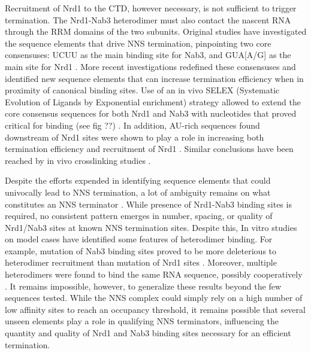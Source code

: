 Recruitment of Nrd1 to the CTD, however necessary, is not sufficient to trigger termination. 
The Nrd1-Nab3 heterodimer must also contact the nascent RNA through the RRM domains of the two subunits.
Original studies have investigated the sequence elements that drive NNS termination, pinpointing two core consensuses: UCUU as the main binding site for Nab3, and GUA[A/G] as the main site for Nrd1 \cite{carroll:2004:identification}. 
More recent investigations redefined these consensuses and identified new sequence elements that can increase termination efficiency when in proximity of canonical binding sites. 
Use of an in vivo SELEX (Systematic Evolution of Ligands by Exponential enrichment) strategy allowed to extend the core consensus sequences for both Nrd1 and Nab3 with nucleotides that proved critical for binding (see fig ??) \cite{porrua:2012:in}. 
In addition, AU-rich sequences found downstream of Nrd1 sites were shown to play a role in increasing both termination efficiency and recruitment of Nrd1 \cite{porrua:2012:in}. Similar conclusions have been reached by in vivo crosslinking studies \cite{wlotzka:2011:nuclear}.

Despite the efforts expended in identifying sequence elements that could univocally lead to NNS termination, a lot of ambiguity remains on what constitutes an NNS terminator \invivo{}. 
While presence of Nrd1-Nab3 binding sites is required, no consistent pattern emerges in number, spacing, or quality of Nrd1/Nab3 sites at known NNS termination sites. 
Despite this, In vitro studies on model cases have identified some features of heterodimer binding. 
For example, mutation of Nab3 binding sites proved to be more deleterious to heterodimer recruitment than mutation of Nrd1 sites \cite{carroll:2007:interaction}. 
Moreover, multiple heterodimers were found to bind the same RNA sequence, possibly cooperatively  \cite{carroll:2007:interaction}. 
It remains impossible, however, to generalize these results beyond the few sequences tested. 
While the NNS complex could simply rely on a high number of low affinity sites to reach an occupancy threshold, it remains possible that several unseen elements play a role in qualifying NNS terminators, influencing the quantity and quality of Nrd1 and Nab3 binding sites necessary for an efficient termination.

